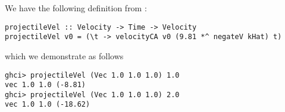
We have the following definition from :
\scriptsize\begin{verbatim}
projectileVel :: Velocity -> Time -> Velocity
projectileVel v0 = (\t -> velocityCA v0 (9.81 *^ negateV kHat) t)
\end{verbatim}\normalsize
which we demonstrate as follows
\scriptsize\begin{verbatim}
ghci> projectileVel (Vec 1.0 1.0 1.0) 1.0
vec 1.0 1.0 (-8.81)
ghci> projectileVel (Vec 1.0 1.0 1.0) 2.0
vec 1.0 1.0 (-18.62)
\end{verbatim}\normalsize
